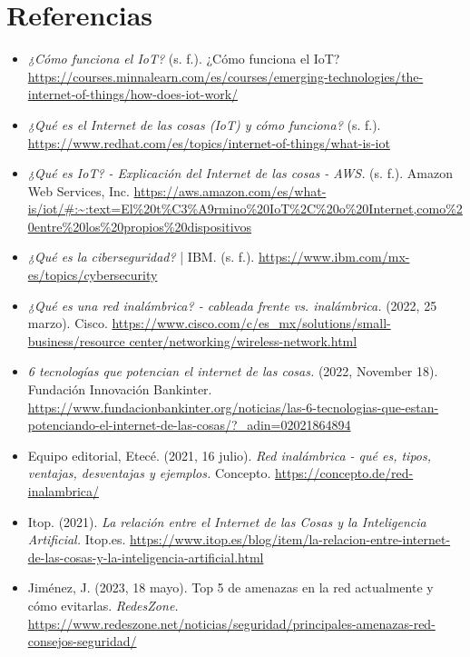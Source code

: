 \documentclass[12pt]{article}
\begin{document}
  \section*{Referencias}
  \begin{itemize}
    \item \textit{¿Cómo funciona el IoT?} (s. f.). ¿Cómo funciona el IoT? \url{https://courses.minnalearn.com/es/courses/emerging-technologies/the-internet-of-things/how-does-iot-work/} \\
    \item \textit{¿Qué es el Internet de las cosas (IoT) y cómo funciona?} (s. f.). \url{https://www.redhat.com/es/topics/internet-of-things/what-is-iot} \\
    \item \textit{¿Qué es IoT? - Explicación del Internet de las cosas - AWS.} (s. f.). Amazon Web Services, Inc. \url{https://aws.amazon.com/es/what-is/iot/#:~:text=El%20t%C3%A9rmino%20IoT%2C%20o%20Internet,como%20entre%20los%20propios%20dispositivos} \\
    \item \textit{¿Qué es la ciberseguridad?} | IBM. (s. f.). \url{https://www.ibm.com/mx-es/topics/cybersecurity} \\
    \item \textit{¿Qué es una red inalámbrica? - cableada frente vs. inalámbrica.} (2022, 25 marzo). Cisco. \url{https://www.cisco.com/c/es_mx/solutions/small-business/resource center/networking/wireless-network.html} \\
    \item \textit{6 tecnologías que potencian el internet de las cosas.} (2022, November 18). Fundación Innovación Bankinter. \url{https://www.fundacionbankinter.org/noticias/las-6-tecnologias-que-estan-potenciando-el-internet-de-las-cosas/?_adin=02021864894} \\
    \item Equipo editorial, Etecé. (2021, 16 julio). \textit{Red inalámbrica - qué es, tipos, ventajas, desventajas y ejemplos.} Concepto. \url{https://concepto.de/red-inalambrica/} \\
    \item Itop. (2021). \textit{La relación entre el Internet de las Cosas y la Inteligencia Artificial.} Itop.es. \url{https://www.itop.es/blog/item/la-relacion-entre-internet-de-las-cosas-y-la-inteligencia-artificial.html} \\
    \item Jiménez, J. (2023, 18 mayo). Top 5 de amenazas en la red actualmente y cómo evitarlas. \textit{RedesZone.} \url{https://www.redeszone.net/noticias/seguridad/principales-amenazas-red-consejos-seguridad/} \\

\end{itemize}
\end{document}
